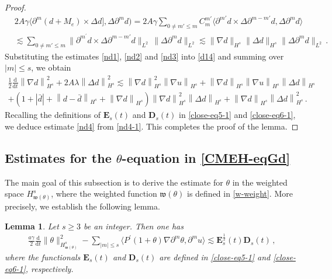 \documentclass[reqno,11pt]{amsart}
\newtheorem{lemma}{Lemma}[section]
\numberwithin{equation}{section}
\def\p{\partial}
\def\d{\mathrm{d}}
\def\w{\mathfrak{w}}
\begin{document}
\begin{proof}
\begin{equation}
\begin{aligned}
& 2A \gamma \langle\p^m(d + M_e) \times \Delta d], \Delta \p^m d) 
= 2A \gamma \sum_{0 \neq m' \leq m} C_m^{m'} \langle \p^{m'} d \times \Delta \p^{m-m'} d, \Delta \p^m d \rangle \\
&\lesssim \sum_{0 \neq m' \leq m} \| \p^{m^\prime} d \times \Delta \p^{m-m'} d \|_{L^2} \, \| \Delta \p^m d \|_{L^2} \lesssim \| \nabla d \|_{H^s} \| \Delta d \|_{H^s} \| \Delta \p^m d \|_{L^2} \,.
\end{aligned}
\end{equation}
Substituting the estimates \eqref{nd1}, \eqref{nd2} and \eqref{nd3} into \eqref{d14} and summing over $|m|\le s$, we obtain
\begin{equation}\label{nd4-1}
\begin{aligned}
\frac{1}{2}\frac{\d}{\d t}\left\| \nabla d \right\|_{H^s}^2 + 2A\lambda \left\| \Delta d \right\|_{H^s}^2 \lesssim \left\| \nabla d \right\|_{H^s}^2 \left\| \nabla u \right\|_{H^s} + \left\| \nabla d \right\|_{H^s} \left\| \nabla u \right\|_{H^s} \left\| \Delta d \right\|_{H^s} \\
+ \left( 1 + |\bar{d}| + \left\| d - \bar{d} \right\|_{H^s} + \left\| \nabla d \right\|_{H^s} \right) \left\| \nabla d \right\|_{H^s}^2 \left\| \Delta d \right\|_{H^s} + \left\| \nabla d \right\|_{H^s} \left\| \Delta d \right\|_{H^s}^2\,.
\end{aligned}
\end{equation}
Recalling the definitions of $\mathbf{E}_s(t)$ and $\mathbf{D}_s(t)$ in \eqref{close-eq5-1} and \eqref{close-eq6-1}, we deduce estimate \eqref{nd4} from \eqref{nd4-1}. This completes the proof of the lemma.
\end{proof}


\subsection{Estimates for the $\theta$-equation in \eqref{CMEH-eqGd}}

The main goal of this subsection is to derive the estimate for $\theta$ in the weighted space $H^s_{\w (\theta)}$, where the weighted function $\w (\theta)$ is defined in \eqref{w-weight}. More precisely, we establish the following lemma.

\begin{lemma}\label{Lmm-G4}
    Let $s \ge 3$ be an integer. Then one has
\begin{equation}\label{nd16}
\begin{aligned}
\frac{a \gamma}{2} \frac{\d}{\d t} \|\theta\|^2_{H^s_{\w (\theta)}} - \sum_{|m| \leq s} \langle P^\prime(1+\theta) \nabla \partial^m \theta, \partial^m u \rangle \lesssim \mathbf{E}_s^\frac{1}{2} (t) \mathbf{D}_s (t) \,,
\end{aligned}
\end{equation}
where the functionals $\mathbf{E}_s (t)$ and $\mathbf{D}_s (t)$ are defined  in \eqref{close-eq5-1} and \eqref{close-eq6-1}, respectively.
\end{lemma}
\end{document}
